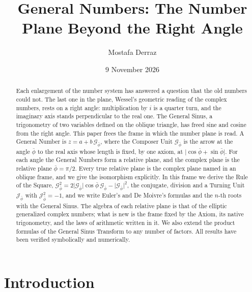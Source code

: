 \documentclass[11pt,a4paper]{amsart}
\theoremstyle{plain}
\theoremstyle{definition}
\theoremstyle{remark}
\newcommand{\pb}{\bar{\phi}}                     %
\newcommand{\Gp}{\mathcal{G}_{\bar{\phi}}}       %
\newcommand{\Jp}{\mathcal{J}_{\bar{\phi}}}       %
\begin{document}
\title{General Numbers: The Number Plane Beyond the Right Angle}

\author{Mostafa Derraz}
\address{Independent Scholar, Tangier, Morocco}

\date{9 November 2026}


\begin{abstract}
Each enlargement of the number system has answered a question that the old numbers could not. The last one in the plane, Wessel's geometric reading of the complex numbers, rests on a right angle: multiplication by $i$ is a quarter turn, and the imaginary axis stands perpendicular to the real one. The General Sinus, a trigonometry of two variables defined on the oblique triangle, has freed sine and cosine from the right angle. This paper frees the frame in which the number plane is read. A General Number is $z = a + b\,\Gp$, where the Composer Unit $\Gp$ is the arrow at the angle $\pb$ to the real axis whose length is fixed, by one axiom, at $\lvert\cos\pb + \sin\pb\rvert$. For each angle the General Numbers form a relative plane, and the complex plane is the relative plane $\pb = \pi/2$. Every true relative plane is the complex plane named in an oblique frame, and we give the isomorphism explicitly. In this frame we derive the Rule of the Square, $\Gp^2 = 2\lvert\Gp\rvert\cos\pb\,\Gp - \lvert\Gp\rvert^2$, the conjugate, division and a Turning Unit $\Jp$ with $\Jp^2 = -1$, and we write Euler's and De Moivre's formulas and the $n$-th roots with the General Sinus. The algebra of each relative plane is that of the elliptic generalized complex numbers; what is new is the frame fixed by the Axiom, its native trigonometry, and the laws of arithmetic written in it. We also extend the product formulas of the General Sinus Transform to any number of factors. All results have been verified symbolically and numerically.
\end{abstract}

\maketitle

\section{Introduction}\label{sec:intro}
\end{document}
